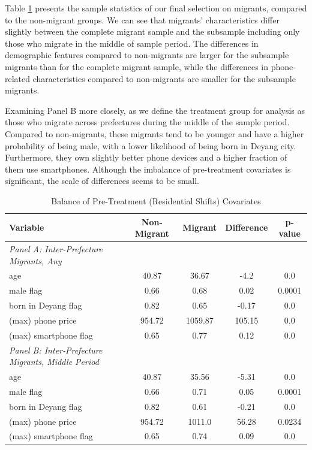 Table \ref{tab:non_migrant_migrant_comparison} presents the sample statistics of our final selection on migrants, compared to the non-migrant groups.
We can see that migrants' characteristics differ slightly between the complete migrant sample and the subsample including only those who migrate in the middle of sample period.
The differences in demographic features compared to non-migrants are larger for the subsample migrants than for the complete migrant sample, while the differences in phone-related characteristics compared to non-migrants are smaller for the subsample migrants.


Examining Panel B more closely, as we define the treatment group for analysis as those who migrate across prefectures during the middle of the sample period.
Compared to non-migrants, these migrants tend to be younger and have a higher probability of being male, with a lower likelihood of being born in Deyang city.
Furthermore, they own slightly better phone devices and a higher fraction of them use smartphones.
Although the imbalance of pre-treatment covariates is significant, the scale of differences seems to be small.

\begin{table}[htbp]
\vspace{0.3cm}
\renewcommand{\arraystretch}{1.6}
\setlength{\tabcolsep}{1mm}{}
\centering
\small
\caption{Balance of Pre-Treatment (Residential Shifts) Covariates}

\begin{tabular}{lcccc} \hline
Variable & Non-Migrant & Migrant & Difference & p-value \\ \hline
\textit{Panel A: Inter-Prefecture Migrants, Any} \\
age & 40.87 & 36.67 & -4.2 & 0.0 \\
male flag & 0.66 & 0.68 & 0.02 & 0.0001 \\
born in Deyang flag & 0.82 & 0.65 & -0.17 & 0.0 \\
(max) phone price & 954.72 & 1059.87 & 105.15 & 0.0 \\
(max) smartphone flag & 0.65 & 0.77 & 0.12 & 0.0 \\ \hline

\textit{Panel B: Inter-Prefecture Migrants, Middle Period} \\
age & 40.87 & 35.56 & -5.31 & 0.0 \\
male flag & 0.66 & 0.71 & 0.05 & 0.0001 \\
born in Deyang flag & 0.82 & 0.61 & -0.21 & 0.0 \\
(max) phone price & 954.72 & 1011.0 & 56.28 & 0.0234 \\
(max) smartphone flag & 0.65 & 0.74 & 0.09 & 0.0 \\ \hline

\end{tabular}

\label{tab:non_migrant_migrant_comparison}%
\end{table}%

